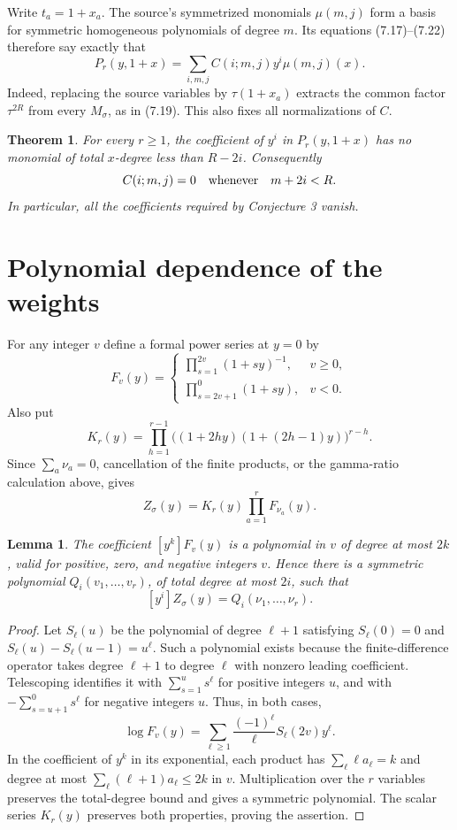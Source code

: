 \documentclass[11pt]{article}
\newtheorem{theorem}{Theorem}
\newtheorem{lemma}{Lemma}
\begin{document}
Write $t_a=1+x_a$. The source's symmetrized monomials
$\mu(m,j)$ form a basis for symmetric homogeneous polynomials of degree
$m$. Its equations (7.17)--(7.22) therefore say exactly that
\begin{equation}\label{eq:C}
 P_r(y,1+x)=\sum_{i,m,j}C(i;m,j)y^i\mu(m,j)(x).
\end{equation}
Indeed, replacing the source variables by $\tau(1+x_a)$ extracts the
common factor $\tau^{2R}$ from every $M_\sigma$, as in (7.19).
This also fixes all normalizations of $C$.

\begin{theorem}\label{thm:main}
For every $r\geq1$, the coefficient of $y^i$ in $P_r(y,1+x)$ has no
monomial of total $x$-degree less than $R-2i$. Consequently
\[
 C(i;m,j)=0\quad\hbox{whenever}\quad m+2i<R.
\]
In particular, all the coefficients required by Conjecture 3 vanish.
\end{theorem}

\section*{Polynomial dependence of the weights}
For any integer $v$ define a formal power series at $y=0$ by
\[
 F_v(y)=
 \begin{cases}
 \displaystyle\prod_{s=1}^{2v}(1+sy)^{-1},&v\geq0,\\[4pt]
 \displaystyle\prod_{s=2v+1}^{0}(1+sy),&v<0.
 \end{cases}
\]
Also put
\[
 K_r(y)=\prod_{h=1}^{r-1}\bigl((1+2hy)(1+(2h-1)y)\bigr)^{r-h}.
\]
Since $\sum_a\nu_a=0$, cancellation of the finite products, or the
gamma-ratio calculation above, gives
\begin{equation}\label{eq:factor}
 Z_\sigma(y)=K_r(y)\prod_{a=1}^r F_{\nu_a}(y).
\end{equation}

\begin{lemma}\label{lem:degree}
The coefficient $[y^k]F_v(y)$ is a polynomial in $v$ of degree at most
$2k$, valid for positive, zero, and negative integers $v$. Hence there
is a symmetric polynomial $Q_i(v_1,\ldots,v_r)$, of total degree at
most $2i$, such that
\[
 [y^i]Z_\sigma(y)=Q_i(\nu_1,\ldots,\nu_r).
\]
\end{lemma}
\begin{proof}
Let $S_\ell(u)$ be the polynomial of degree $\ell+1$ satisfying
$S_\ell(0)=0$ and
$S_\ell(u)-S_\ell(u-1)=u^\ell$. Such a polynomial exists because the
finite-difference operator takes degree $\ell+1$ to degree $\ell$ with
nonzero leading coefficient. Telescoping identifies it with
$\sum_{s=1}^{u}s^\ell$ for positive integers $u$, and with
$-\sum_{s=u+1}^{0}s^\ell$ for negative integers $u$. Thus, in both cases,
\[
 \log F_v(y)=\sum_{\ell\geq1}\frac{(-1)^\ell}{\ell}
                              S_\ell(2v)y^\ell.
\]
In the coefficient of $y^k$ in its exponential, each product has
$\sum_\ell \ell a_\ell=k$ and degree at most
$\sum_\ell(\ell+1)a_\ell\leq2k$ in $v$.
Multiplication over the $r$ variables preserves the total-degree bound
and gives a symmetric polynomial. The scalar series $K_r(y)$ preserves
both properties, proving the assertion.
\end{proof}
\end{document}
